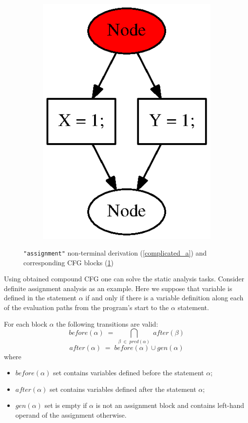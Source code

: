 \begin{figure}[h!]
\begin{center}
\begin{subfigure}{0.1\textwidth}
            \includegraphics[scale=0.5]{Graphs/assignment_complicated.eps}
        \caption{}
        \label{complicated_b}
    \end{subfigure}
    \caption{\texttt{"assignment"} non-terminal derivation (\ref{complicated_a}) and corresponding CFG blocks (\ref{complicated_b})}
    \label{complicated_example_pic}
    \end{center}
\end{figure}
Using obtained compound CFG one can solve the static analysis tasks. Consider definite assignment analysis as an example. Here we suppose that variable is defined in the statement $\alpha$ if and only if there is a variable definition along each of the evaluation paths from the program's start to the $\alpha$ statement. 

For each block $\alpha$ the following transitions are valid:
$$
before (\alpha) \;=\; \bigcap_{\beta \;\in\; pred(\alpha)} \;after(\beta)
$$
$$
after (\alpha) \;=\; before(\alpha) \cup gen(\alpha)
$$
where
\begin{itemize}
\item $before(\alpha)$ set contains variables defined before the statement $\alpha$;
\item $after(\alpha)$ set contains variables defined after the statement $\alpha$;
\item $gen(\alpha)$ set is empty if $\alpha$ is not an assignment block and contains left-hand operand of the assignment otherwise. 
\end{itemize}

